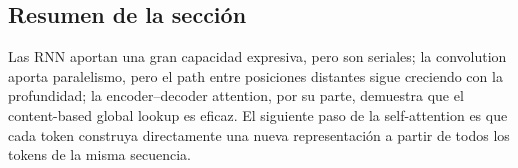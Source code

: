 
\subsection{Resumen de la sección}

Las RNN aportan una gran capacidad expresiva, pero son seriales; la convolution aporta paralelismo, pero el path entre posiciones distantes sigue creciendo con la profundidad; la encoder--decoder attention, por su parte, demuestra que el content-based global lookup es eficaz. El siguiente paso de la self-attention es que cada token construya directamente una nueva representación a partir de todos los tokens de la misma secuencia.
